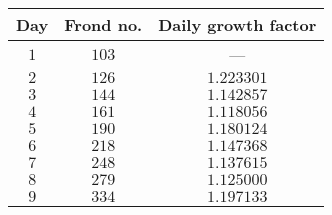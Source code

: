 \begin{tabular}{ccc}                    \toprule
Day & Frond no. & Daily growth factor \\\midrule
$1$ & $103$     & ---        \\
$2$ & $126$     & $1.223301$ \\
$3$ & $144$     & $1.142857$ \\
$4$ & $161$     & $1.118056$ \\
$5$ & $190$     & $1.180124$ \\
$6$ & $218$     & $1.147368$ \\
$7$ & $248$     & $1.137615$ \\
$8$ & $279$     & $1.125000$ \\
$9$ & $334$     & $1.197133$ \\\bottomrule
\end{tabular}
